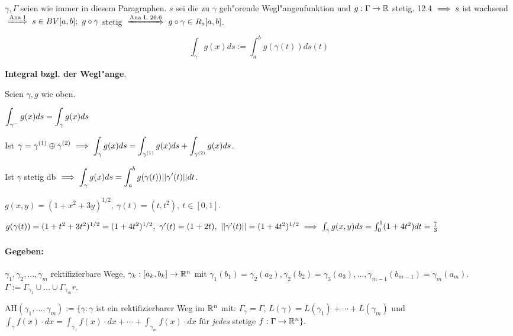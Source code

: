 \documentclass[a4paper,twoside,DIV15,BCOR12mm,chapterprefix=true,headings=twolinechapter]{scrbook}
\begin{document}
\begin{definition}
$\gamma,\Gamma$ seien wie immer in diesem Paragraphen. $s$ sei die zu $\gamma$ geh"orende Wegl"angenfunktion und $g:\Gamma \to \mathbb{R}$ stetig. 12.4 $\implies s$ ist wachsend $\folgtnach{Ana I} s \in BV[a,b];\ g\circ\gamma$ stetig $\folgtnach{Ana I, 26.6} g\circ\gamma \in R_s[a,b]$.

$$\int_\gamma g(x) ds := \int_a^b g(\gamma(t))ds(t)$$

\textbf{Integral bzgl. der Wegl"ange}.
\end{definition}

\begin{satz}
Seien $\gamma,g$ wie oben.
\begin{liste}
\item $\displaystyle{\int_{\gamma^-} g(x) ds = \int_\gamma g(x) ds}$
\item Ist $\displaystyle{\gamma = \gamma^{(1)} \oplus \gamma^{(2)} \ensuremath{\implies}\int_\gamma g(x)ds = \int_{\gamma^{(1)}} g(x)ds + \int_{\gamma^{(2)}} g(x)ds}$.
\item Ist $\gamma$ stetig db $\implies \displaystyle{\int_\gamma g(x)ds = \int_a^b g(\gamma(t))||\gamma'(t)||dt}$.
\end{liste}
\end{satz}

\begin{beispiel}
$g(x,y) = (1+x^2+3y)^{1/2},\ \gamma(t) = (t,t^2),\ t\in[0,1].$

$g(\gamma(t)) = (1+t^2+3t^2)^{1/2} = (1+4t^2)^{1/2},\ \gamma'(t) = (1+2t),\ ||\gamma'(t)|| = (1+4t^2)^{1/2} \implies \int_\gamma g(x,y)ds = \int_0^1 (1+4t^2) dt = \frac{7}{3}$
\end{beispiel}

\paragraph{Gegeben:} $\gamma_1,\gamma_2,\ldots,\gamma_m$ rektifizierbare Wege, $\gamma_k:[a_k,b_k]\to\mathbb{R}^n$ mit $\gamma_1(b_1) = \gamma_2(a_2), \gamma_2(b_2) = \gamma_3(a_3),\ldots , \gamma_{m-1}(b_{m-1}) = \gamma_m(a_m)$. $\Gamma := \Gamma_{\gamma_1} \cup \ldots \cup \Gamma_{\gamma_m}r$.

$\text{AH}(\gamma_1,\ldots,\gamma_m) := \{\gamma:\gamma$ ist ein rektifizierbarer Weg im $\mathbb{R}^n$ mit: $\Gamma_\gamma=\Gamma$, $L(\gamma)=L(\gamma_1)+\cdots+L(\gamma_m)$ und $\int_\gamma f(x)\cdot dx = \int_{\gamma_1}f(x)\cdot dx+ \cdots + \int_{\gamma_m}f(x)\cdot dx$ für \emph{jedes} stetige $f:\Gamma\to\mathbb{R}^n\}.$
\end{document}
